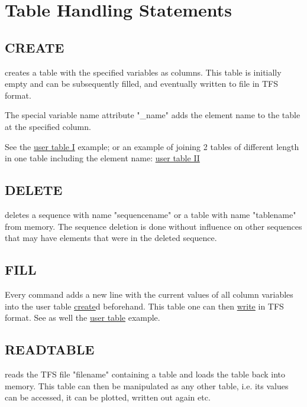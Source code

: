 \chapter{Table Handling Statements} 
\label{chap:tables}

\section{CREATE}
\label{sec:create}
creates a table with the specified variables as columns. 
This table is initially empty and can be subsequently filled, and
eventually written to file in TFS format.  

The special variable name attribute "\_name" adds
the element name to the table at the specified column.


See the \href{../Introduction/select.html#ucreate}{user table I}
example; 
or an example of joining 2 tables of different length in one table
including the element name:
\href{../Introduction/select.html#screate}{user table II} 

\section{DELETE}
\label{sec:delete}
deletes a sequence with name "sequencename" or a table with name "tablename"
from memory. The sequence deletion is done without influence on other
sequences that may have elements that were in the deleted sequence.   

\section{FILL} 
\label{sec:fill}
Every command 
adds a new line with the current values of all column variables into the
user table \hyperlink{create}{create}d beforehand. This table one can
then \hyperlink{write}{write} in TFS format.  See as well the
\href{../Introduction/select.html#ucreate}{user table} example.  

\section{READTABLE}
\label{sec:readtable}
reads the TFS file "filename" containing a \mad table and loads the
table back into memory. This table can then be manipulated as any other
table, i.e. its values can be accessed, it can be plotted, written out
again etc.

